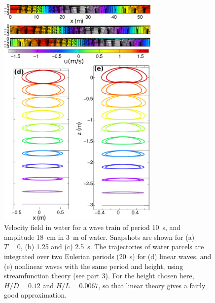 \begin{figure}
\centerline{\includegraphics[width=0.7\textwidth]{FIGS_CH_AIRY/10sec_3mdepth_puv_drift.pdf}}
  \caption{Velocity field in water for a wave train of period 10~s, and amplitude 18~cm in 3~m of water. Snapshots are shown for 
(a) $T=0$, (b) 1.25 and (c) 2.5~s. 
The trajectories of water parcels are integrated over two Eulerian periods  (20~s) for (d) linear waves, and (e) nonlinear waves with the 
same period and height, using streamfunction theory (see part 3). For the height chosen here, $H/D=0.12$ and $H/L=0.0067$, so that 
linear theory gives a  fairly good approximation. }
\label{fig:uv2}
\end{figure}



